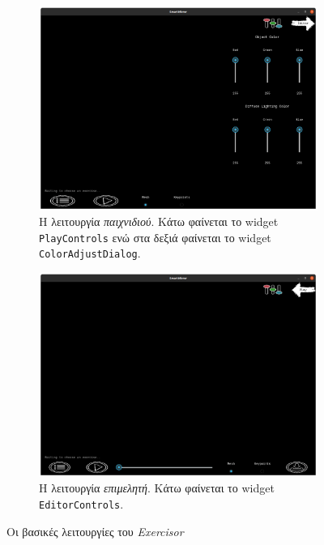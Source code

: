 \begin{figure}[h]
	\centering
	\begin{subfigure}[h]{0.45\textwidth}
		\centering
		\includegraphics[width=\textwidth]{images/chapter5/play_screen.png}
		\caption[H λειτουργία \textsl{παιχνιδιού}]{H λειτουργία \textsl{παιχνιδιού}. Κάτω φαίνεται το widget \texttt{PlayControls} ενώ στα δεξιά φαίνεται το widget \texttt{ColorAdjustDialog}.}
		\label{fig:play_screen}
	\end{subfigure}
	\hfill
	\begin{subfigure}[h]{0.45\textwidth}
		\centering
		\includegraphics[width=\textwidth]{images/chapter5/editor_screen.png}
		\caption[H λειτουργία \textsl{επιμελητή}]{H λειτουργία \textsl{επιμελητή}. Κάτω φαίνεται το widget \texttt{EditorControls}.}
		\label{fig:editor_screen}
	\end{subfigure}
	\caption{Οι βασικές λειτουργίες του \textsl{Exercisor}}
	\label{fig:basic_screens_ui}
\end{figure}



